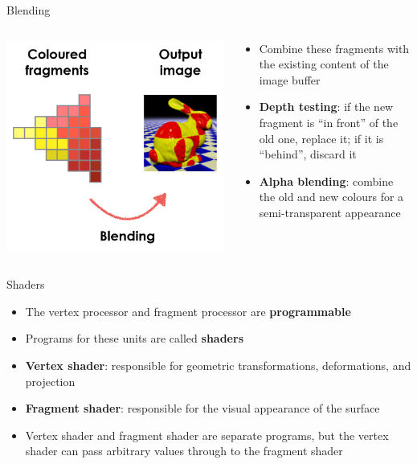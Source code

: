 \begin{frame}{Blending}
\begin{columns}
\begin{column}{0.3\textwidth}
\includegraphics[width=\textwidth]{pipeline_4}
\end{column}
\begin{column}{0.65\textwidth}
\begin{itemize}
\pause\item Combine these fragments with the existing content of the image buffer
\pause\item \textbf{Depth testing}: if the new fragment is ``in front'' of the old one, replace it;
if it is ``behind'', discard it
\pause\item \textbf{Alpha blending}: combine the old and new colours for a semi-transparent appearance
\end{itemize}
\end{column}
\end{columns}
\end{frame}

\begin{frame}{Shaders}
\begin{itemize}
\pause\item The vertex processor and fragment processor are \textbf{programmable}
\pause\item Programs for these units are called \textbf{shaders}
\pause\item \textbf{Vertex shader}: responsible for geometric transformations, deformations, and projection
\pause\item \textbf{Fragment shader}: responsible for the visual appearance of the surface
\pause\item Vertex shader and fragment shader are separate programs,
but the vertex shader can pass arbitrary values through to the fragment shader
\end{itemize}
\end{frame}